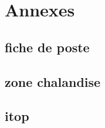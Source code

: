 \section{Annexes}
\label{ddrs}
\subsection{fiche de poste}
\subsection{zone chalandise}
\subsection{itop}